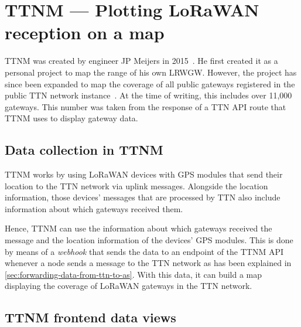 \section{\acl{TTNM} — Plotting \acs{LoRaWAN} reception on a map}

\acf{TTNM} was created by engineer JP Meijers in 2015~\cite{linkedin_23_nodate}.
He first created it as a personal project to map the range of his own \acl{LRWGW}.
However, the project has since been expanded to map the coverage of all public gateways registered in the public \ac{TTN} network instance~\cite{the_things_network_jp_2018}.
At the time of writing, this includes over 11,000 gateways.
This number was taken from the response of a \ac{TTN} \ac{API} route that \ac{TTNM} uses to display gateway data.

\subsection{Data collection in \acl{TTNM}}\label{sec:ttm-data-collection}

\acl{TTNM} works by using \ac{LoRaWAN} devices with \ac{GPS} modules that send their location to the \ac{TTN} network via uplink messages.
Alongside the location information, those devices' messages that are processed by \ac{TTN} also include information about which gateways received them.

Hence, \acl{TTNM} can use the information about which gateways received the message and the location information of the devices' \ac{GPS} modules.
This is done by means of a \emph{webhook} that sends the data to an endpoint of the \acl{TTNM} \ac{API} whenever a node sends a message to the \ac{TTN} network as has been explained in \cref{sec:forwarding-data-from-ttn-to-as}.
With this data, it can build a map displaying the coverage of \ac{LoRaWAN} gateways in the \ac{TTN} network.

\subsection{\acl{TTNM} frontend data views}

